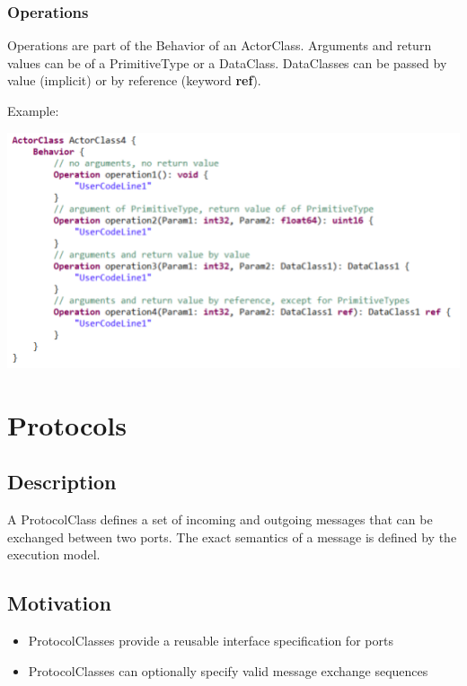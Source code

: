 \subsubsection{Operations}

Operations are part of the Behavior of an ActorClass.  Arguments and return values can be of a 
PrimitiveType or a DataClass. DataClasses can be passed by value (implicit) or by reference (keyword 
\textbf{ref}).

Example:

\includegraphics{images/040-ActorClassOperations.png}

\section{Protocols}

\subsection{Description}

A ProtocolClass defines a set of incoming and outgoing messages that can be exchanged between two ports.
The exact semantics of a message is defined by the execution model.

\subsection{Motivation}

\begin{itemize}
\item ProtocolClasses provide a reusable interface specification for ports
\item ProtocolClasses can optionally specify valid message exchange sequences
\end{itemize}


